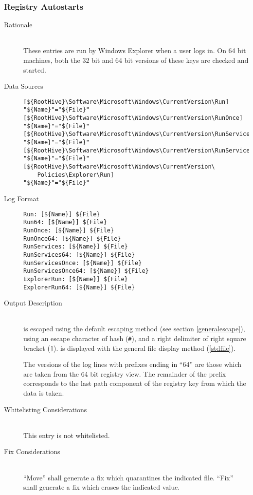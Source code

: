 \subsubsection{Registry Autostarts}
\begin{description}
\item[Rationale] \hfill \\
These entries are run by Windows Explorer when a user logs in. On 64 bit
machines, both the 32 bit and 64 bit versions of these keys are checked and
started.
\item[Data Sources] \hfill
\vspace{-\baselineskip}
\begin{verbatim}
[${RootHive}\Software\Microsoft\Windows\CurrentVersion\Run]
"${Name}"="${File}"
[${RootHive}\Software\Microsoft\Windows\CurrentVersion\RunOnce]
"${Name}"="${File}"
[${RootHive}\Software\Microsoft\Windows\CurrentVersion\RunServices]
"${Name}"="${File}"
[${RootHive}\Software\Microsoft\Windows\CurrentVersion\RunServicesOnce]
"${Name}"="${File}"
[${RootHive}\Software\Microsoft\Windows\CurrentVersion\
    Policies\Explorer\Run]
"${Name}"="${File}"
\end{verbatim}
\item[Log Format] \hfill
\vspace{-\baselineskip}
\begin{verbatim}
Run: [${Name}] ${File}
Run64: [${Name}] ${File}
RunOnce: [${Name}] ${File}
RunOnce64: [${Name}] ${File}
RunServices: [${Name}] ${File}
RunServices64: [${Name}] ${File}
RunServicesOnce: [${Name}] ${File}
RunServicesOnce64: [${Name}] ${File}
ExplorerRun: [${Name}] ${File}
ExplorerRun64: [${Name}] ${File}
\end{verbatim}
\item[Output Description] \hfill \\
 is escaped using the default escaping method (see section
\ref{generalescape}), using an escape character of hash (\verb|#|), and a right
delimiter of right square bracket (\verb|]|). \var{File} is displayed with the
general file display method (\ref{stdfile}).

The versions of the log lines with prefixes ending in ``64'' are those which are
taken from the 64 bit registry view. The remainder of the prefix corresponds to
the last path component of the registry key from which the data is taken.
\item[Whitelisting Considerations] \hfill \\
This entry is not whitelisted.
\item[Fix Considerations] \hfill \\
``Move'' shall generate a fix which quarantines the indicated file. ``Fix''
shall generate a fix which erases the indicated value.
\end{description}

